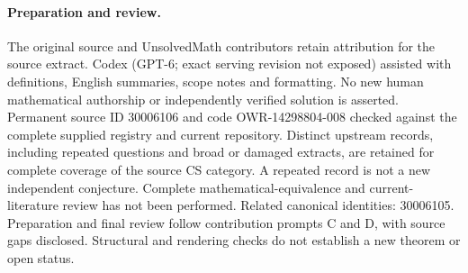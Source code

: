 \documentclass[11pt]{article}
\begin{document}
\paragraph{Preparation and review.}
The original source and UnsolvedMath contributors retain attribution for the source extract. Codex (GPT-6; exact serving revision not exposed) assisted with definitions, English summaries, scope notes and formatting. No new human mathematical authorship or independently verified solution is asserted. Permanent source ID 30006106 and code OWR-14298804-008 checked against the complete supplied registry and current repository. Distinct upstream records, including repeated questions and broad or damaged extracts, are retained for complete coverage of the source CS category. A repeated record is not a new independent conjecture. Complete mathematical-equivalence and current-literature review has not been performed. Related canonical identities: 30006105. Preparation and final review follow contribution prompts C and D, with source gaps disclosed. Structural and rendering checks do not establish a new theorem or open status.
\label{end:30006106}
\end{document}
